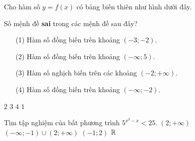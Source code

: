 \begin{ex}%
Cho hàm số $ y=f(x) $ có bảng biến thiên như hình dưới đây.
\begin{center}
\end{center}
Số mệnh đề {\bf sai} trong các mệnh đề sau đây?
\begin{itemize}
	\item[(1)] Hàm số đồng biến trên khoảng $ (-3;-2). $
	\item[(2)] Hàm số đồng biến trên khoảng $ (-\infty;5). $
	\item[(3)] Hàm số nghịch biến trên các khoảng $ (-2;+\infty). $
	\item[(4)] Hàm số đồng biến trên khoảng $ (-\infty;-2). $
\end{itemize}
\choice
{$ 2 $}
{$ 3 $}
{$ 4 $}
{\True $ 1 $}
\end{ex}

\begin{ex}%
Tìm tập nghiệm của bất phương trình $ 5^{x^2-x}<25. $
\choice
{$ (2;+\infty) $}
{$(-\infty;-1)\cup (2;+\infty) $}
{\True $ (-1;2) $}
{$ \Bbb{R} $}
\end{ex}

